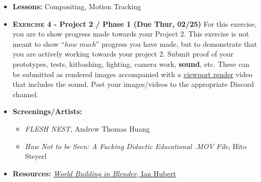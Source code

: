 \def\dMon{Mon, 02/22}
\def\dTues{Tues, 02/23}
\def\dWed{Wed, 02/24}
\def\dThur{Thur, 02/25}
\def\dFri{Fri, 02/26}
\def\dSat{Sat, 02/27}
\def\dSun{Sun, 02/28}
\placeDate

\begin{itemize}[noitemsep,topsep=0pt,leftmargin=*]
    \item \textbf{Lessons:} Compositing, Motion Tracking
    \item \textbf{\textsc{Exercise 4} - Project 2 / Phase 1 (Due \dThur)} For this exercise, you are to show progress made towards your Project 2. This exercise is not meant to show ``\emph{how much}'' progress you have made, but to demonstrate that you are actively working towards your project 2. Submit proof of your prototypes, tests, kitbashing, lighting, camera work, \textbf{sound}, etc. These can be submitted as rendered images accompanied with a \href{https://docs.blender.org/manual/en/latest/editors/3dview/viewport_render.html}{viewport render} video that includes the sound. Post your images/videos to the appropriate Discord channel.
    \item \textbf{Screenings/Artists:}
          \begin{itemize}
              \item \emph{FLESH NEST}, Andrew Thomas Huang
              \item \emph{How Not to be Seen: A Fucking Didactic Educational .MOV File}, Hito Steyerl
          \end{itemize}
    \item \textbf{Resources:} \href{https://www.youtube.com/watch?v=whPWKecazgM}{\emph{World Building in Blender}, Ian Hubert}
\end{itemize}